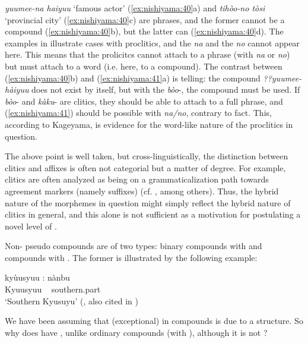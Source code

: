 \documentclass[output=paper]{LSP/langsci}
\begin{document}
\textit{yuumee-na haiyuu} ‘famous actor’ (\ref{ex:nishiyama:40}a) and \textit{tihòo-no tòsi} ‘provincial city’ (\ref{ex:nishiyama:40}c) are phrases, and the former cannot be a compound (\ref{ex:nishiyama:40}b), but the latter can (\ref{ex:nishiyama:40}d). The examples in  illustrate cases with proclitics, and the   \textit{na} and the   \textit{no} cannot appear here. This means that the prolicitcs cannot attach to a phrase (with \textit{na} or \textit{no}) but must attach to a word (i.e. here, to a compound). The contrast between (\ref{ex:nishiyama:40}b) and (\ref{ex:nishiyama:41}a) is telling: the compound \textit{??yuumee-hàiyuu} does not exist by itself, but with the  \textit{bòo}{}-, the compound must be used. If \textit{bòo}{}- and \textit{kàku}{}- are clitics, they should be able to attach to a full phrase, and (\ref{ex:nishiyama:41}) should be possible with \textit{na/no}, contrary to fact. This, according to Kageyama, is evidence for the word-like nature of the proclitics in question.

The above point is well taken, but cross-linguistically, the distinction between clitics and affixes is often not categorial but a matter of degree. For example,  clitics are often analyzed as being on a grammaticalization path towards agreement markers (namely suffixes) (cf. \citealt{Suner1988}, among others). Thus, the hybrid nature of the morphemes in question might simply reflect the hybrid nature of clitics in general, and this alone is not sufficient as a motivation for postulating a novel level of .

Non- pseudo compounds are of two types: binary compounds with  and  compounds with . The former is illustrated by the following example:

\ea\label{ex:nishiyama:42}
\gll   kyùusyuu : nànbu\\
    Kyuusyuu ~ southern.part\\
\glt ‘Southern Kyusuyu’    (\citealt[70]{Kubozono1995}, also cited in \citealt[261]{Kageyama2001})
\z

We have been assuming that (exceptional)  in compounds is due to a  structure. So why does  have , unlike ordinary compounds (with ), although it is not ?
\end{document}
